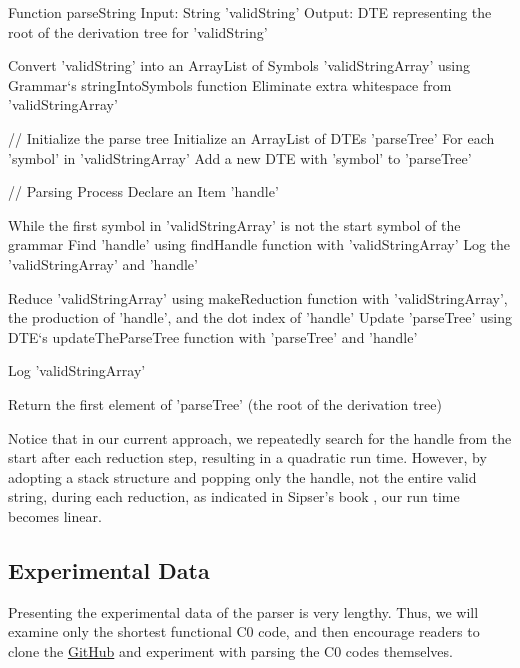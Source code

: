\begin{codeblock}
    Function parseString
    Input: String 'validString'
    Output: DTE representing the root of the derivation tree for 'validString'

    Convert 'validString' into an ArrayList of Symbols 'validStringArray' using Grammar`s stringIntoSymbols function
    Eliminate extra whitespace from 'validStringArray'

    // Initialize the parse tree
    Initialize an ArrayList of DTEs 'parseTree'
    For each 'symbol' in 'validStringArray'
    Add a new DTE with 'symbol' to 'parseTree'

    // Parsing Process
    Declare an Item 'handle'

    While the first symbol in 'validStringArray' is not the start symbol of the grammar
    Find 'handle' using findHandle function with 'validStringArray'
    Log the 'validStringArray' and 'handle'

    Reduce 'validStringArray' using makeReduction function with 'validStringArray', the production of 'handle', and the dot index of 'handle'
    Update 'parseTree' using DTE`s updateTheParseTree function with 'parseTree' and 'handle'

    Log 'validStringArray'

    Return the first element of 'parseTree' (the root of the derivation tree)
\end{codeblock}


Notice that in our current approach, we repeatedly search for the handle from the start after each reduction step, resulting in a quadratic run time. However, by adopting a stack structure and popping only the handle, not the entire valid string, during each reduction, as indicated in Sipser's book \cite{sipser}, our run time becomes linear.

\vspace{20pt}

\subsection{Experimental Data}

Presenting the experimental data of the parser is very lengthy. Thus, we will examine only the shortest functional C0 code, and then encourage readers to clone the \href{https://github.com/fyfsb/dcfg.git}{GitHub} and experiment with parsing the C0 codes themselves.\\

